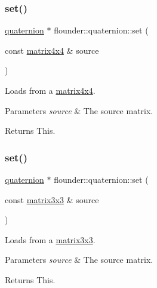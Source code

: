 \subsubsection{\texorpdfstring{set()}{set()}\hspace{0.1cm}{\footnotesize\ttfamily [4/5]}}
{\footnotesize\ttfamily \hyperlink{classflounder_1_1quaternion}{quaternion} $\ast$ flounder\+::quaternion\+::set (\begin{DoxyParamCaption}\item[{const \hyperlink{classflounder_1_1matrix4x4}{matrix4x4} \&}]{source }\end{DoxyParamCaption})}



Loads from a \hyperlink{classflounder_1_1matrix4x4}{matrix4x4}. 


\begin{DoxyParams}{Parameters}
{\em source} & The source matrix. \\
\hline
\end{DoxyParams}
\begin{DoxyReturn}{Returns}
This. 
\end{DoxyReturn}
\mbox{\label{classflounder_1_1quaternion_a35fb76e3f342c7f1f16ae893857b490e}} 
\subsubsection{\texorpdfstring{set()}{set()}\hspace{0.1cm}{\footnotesize\ttfamily [5/5]}}
{\footnotesize\ttfamily \hyperlink{classflounder_1_1quaternion}{quaternion} $\ast$ flounder\+::quaternion\+::set (\begin{DoxyParamCaption}\item[{const \hyperlink{classflounder_1_1matrix3x3}{matrix3x3} \&}]{source }\end{DoxyParamCaption})}



Loads from a \hyperlink{classflounder_1_1matrix3x3}{matrix3x3}. 


\begin{DoxyParams}{Parameters}
{\em source} & The source matrix. \\
\hline
\end{DoxyParams}
\begin{DoxyReturn}{Returns}
This. 
\end{DoxyReturn}
\mbox{\label{classflounder_1_1quaternion_a4f8671c6652ea6f02710dbd9b1790da8}} 
